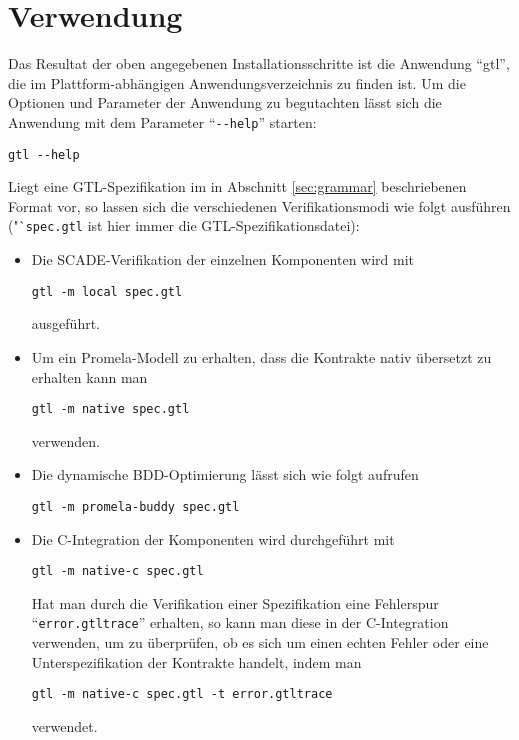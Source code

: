 \section{Verwendung}
Das Resultat der oben angegebenen Installationsschritte ist die Anwendung "`gtl"', die im Plattform-abhängigen Anwendungsverzeichnis zu finden ist.
Um die Optionen und Parameter der Anwendung zu begutachten lässt sich die Anwendung mit dem Parameter "`\verb|--help|"' starten:
\begin{verbatim}
gtl --help
\end{verbatim}
Liegt eine GTL-Spezifikation im in Abschnitt \ref{sec:grammar} beschriebenen Format vor, so lassen sich die verschiedenen Verifikationsmodi wie folgt ausführen ("`\verb|spec.gtl| ist hier immer die GTL-Spezifikationsdatei):
\begin{itemize}
\item Die SCADE-Verifikation der einzelnen Komponenten wird mit
\begin{verbatim}
gtl -m local spec.gtl
\end{verbatim}
ausgeführt.
\item Um ein Promela-Modell zu erhalten, dass die Kontrakte nativ übersetzt zu erhalten kann man
\begin{verbatim}
gtl -m native spec.gtl
\end{verbatim}
verwenden.
\item Die dynamische BDD-Optimierung lässt sich wie folgt aufrufen
\begin{verbatim}
gtl -m promela-buddy spec.gtl
\end{verbatim}
\item Die C-Integration der Komponenten wird durchgeführt mit
\begin{verbatim}
gtl -m native-c spec.gtl
\end{verbatim}
Hat man durch die Verifikation einer Spezifikation eine Fehlerspur "`\verb|error.gtltrace|"' erhalten, so kann man diese in der C-Integration verwenden, um zu überprüfen, ob es sich um einen echten Fehler oder eine Unterspezifikation der Kontrakte handelt, indem man
\begin{verbatim}
gtl -m native-c spec.gtl -t error.gtltrace
\end{verbatim}
verwendet.
\end{itemize}
